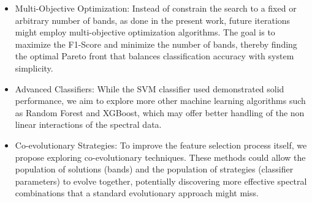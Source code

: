 \documentclass[aipa,article,submit,pdftex,moreauthors]{Definitions/mdpi}
\begin{document}
\begin{itemize}
    \item Multi-Objective Optimization: Instead of constrain the search to a fixed or arbitrary number of bands, as done in the present work, future iterations might employ multi-objective optimization algorithms. The goal is to maximize the F1-Score and minimize the number of bands, thereby finding the optimal Pareto front that balances classification accuracy with system simplicity.
    \item Advanced Classifiers: While the SVM classifier used demonstrated solid performance, we aim to explore more other machine learning algorithms such as Random Forest and XGBoost, which may offer better handling of the non linear interactions of the spectral data. 
    \item Co-evolutionary Strategies: To improve the feature selection process itself, we propose exploring co-evolutionary techniques. These methods could allow the population of solutions (bands) and the population of strategies (classifier parameters) to evolve together, potentially discovering more effective spectral combinations that a standard evolutionary approach might miss.
\end{itemize}

\vspace{6pt} 



\end{document}
